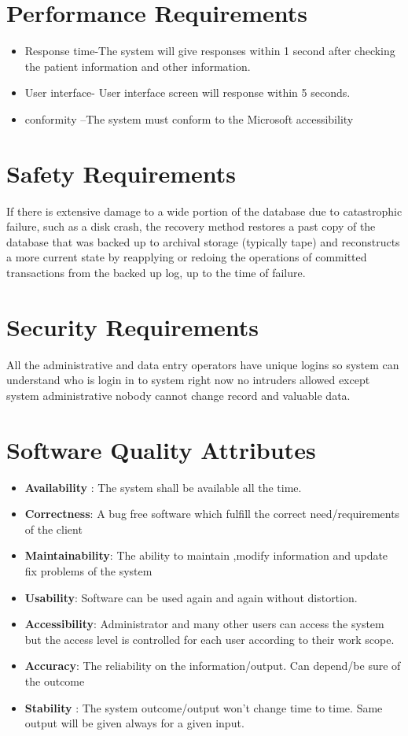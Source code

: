 \documentclass{scrreprt}
\begin{document}
\section{Performance Requirements}

 \begin{itemize}
\item Response time-The system will give responses within 1 second after checking the patient
information and other information.
 \item  User interface- User interface screen will response within 5 seconds.
 \item conformity –The system must conform to the Microsoft accessibility
\end {itemize}
\section{Safety Requirements}
If there is extensive damage to a wide portion of the database due to catastrophic failure, such as a disk crash, the recovery method restores a past copy of the database that was backed up to archival storage (typically tape) and reconstructs a more current state by reapplying or redoing the operations of committed transactions from the backed up log, up to the time of failure.

\section{Security Requirements}
All the administrative and data entry operators have unique logins so system can
understand who is login in to system right now no intruders allowed except system
administrative nobody cannot change record and valuable data.

\section{Software Quality Attributes}
 \begin {itemize}
\item\textbf{Availability} : The system shall be available all the time.
\item \textbf{Correctness}: A bug free software which fulfill the correct need/requirements of the
client
\item \textbf{Maintainability}: The ability to maintain ,modify information and update fix
problems of the system
\item \textbf{ Usability}:  Software can be used again and again without distortion.
\item \textbf{Accessibility}: Administrator and many other users can access the system but the
access level is controlled for each user according to their work scope. 
\item \textbf{Accuracy}:  The reliability on the information/output. Can depend/be sure of the
outcome
\item \textbf{ Stability} : The system outcome/output won’t change time to time. Same output will
be given always for a given input.
\end {itemize}
\end{document}
